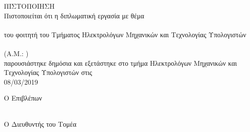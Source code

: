 \pagestyle{empty}
\begin{center}
{\LARGE ΠΙΣΤΟΠΟΙΗΣΗ\\[1cm]}
\large Πιστοποιείται ότι η διπλωματική εργασία με θέμα\\[1cm]
\textbf{\large \doctitle }\\[1cm]
του φοιτητή του Τμήματος Ηλεκτρολόγων Μηχανικών και Τεχνολογίας Υπολογιστών\\[1.5cm]
\me \\[0.5cm]
(Α.Μ.: \studnum )\\[1.5cm]
παρουσιάστηκε δημόσια και εξετάστηκε στο τμήμα  Ηλεκτρολόγων Μηχανικών και Τεχνολογίας Υπολογιστών στις\\[1cm]
\Large{08/03/2019}\\[1.5cm]
\end{center}
\begin{minipage}{0.5\textwidth}
\begin{flushleft} \large
Ο Επιβλέπων\\[4cm]
\supname \\
\emph{\suptitle}
\end{flushleft}
\end{minipage}
\begin{minipage}{0.5\textwidth}
\begin{flushright} \large
Ο Διευθυντής του Τομέα\\[4cm]
\headofdivision\\
\emph{\headofdivisiontitle}
\end{flushright}
\end{minipage}
